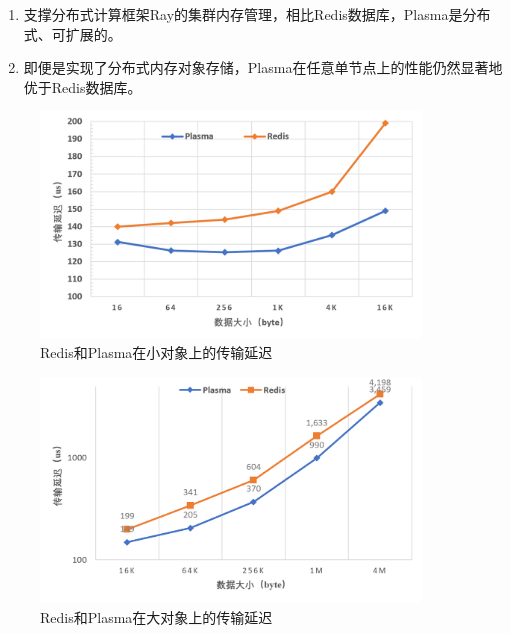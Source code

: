 \begin{enumerate}
    \item 支撑分布式计算框架Ray的集群内存管理，相比Redis数据库，Plasma是分布式、可扩展的。
    \item 即便是实现了分布式内存对象存储，Plasma在任意单节点上的性能仍然显著地优于Redis数据库。
\end{enumerate}

\begin{figure}[h]
	\centering
	\includegraphics[width=0.9\textwidth]{image/chap04/redis_small.png}
	\caption{Redis和Plasma在小对象上的传输延迟}
	\label{fig:redis_small}
\end{figure}

\begin{figure}[h]
	\centering
	\includegraphics[width=0.9\textwidth]{image/chap04/redis_big.png}
	\caption{Redis和Plasma在大对象上的传输延迟}
	\label{fig:redis_big}
\end{figure}